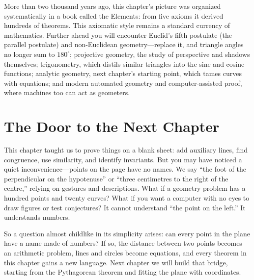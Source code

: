 \begin{pandeng}
More than two thousand years ago, this chapter's picture was organized systematically in a book called the Elements: from five axioms it derived hundreds of theorems. This axiomatic style remains a standard currency of mathematics. Further ahead you will encounter Euclid's fifth postulate (the parallel postulate) and non-Euclidean geometry---replace it, and triangle angles no longer sum to $180^\circ$; projective geometry, the study of perspective and shadows themselves; trigonometry, which distils similar triangles into the sine and cosine functions; analytic geometry, next chapter's starting point, which tames curves with equations; and modern automated geometry and computer-assisted proof, where machines too can act as geometers.
\end{pandeng}

\section*{The Door to the Next Chapter}

This chapter taught us to prove things on a blank sheet: add auxiliary lines, find congruence, use similarity, and identify invariants. But you may have noticed a quiet inconvenience---points on the page have no names. We say ``the foot of the perpendicular on the hypotenuse'' or ``three centimetres to the right of the centre,'' relying on gestures and descriptions. What if a geometry problem has a hundred points and twenty curves? What if you want a computer with no eyes to draw figures or test conjectures? It cannot understand ``the point on the left.'' It understands numbers.

So a question almost childlike in its simplicity arises: can every point in the plane have a name made of numbers? If so, the distance between two points becomes an arithmetic problem, lines and circles become equations, and every theorem in this chapter gains a new language. Next chapter we will build that bridge, starting from the Pythagorean theorem and fitting the plane with coordinates.
